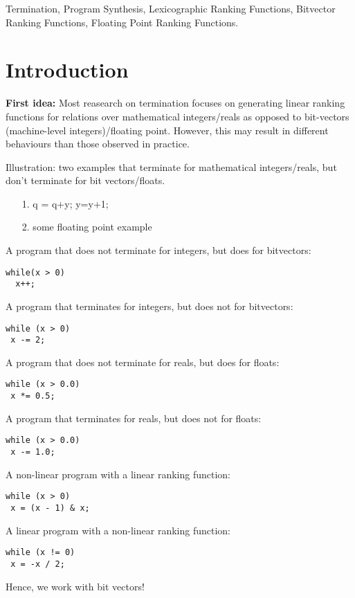 \documentclass[preprint]{sigplanconf}
\theoremstyle{definition}
\begin{document}
\keywords
Termination, Program Synthesis, Lexicographic Ranking Functions, Bitvector Ranking Functions,
Floating Point Ranking Functions.

\section{Introduction}
{\bf First idea:}
Most reasearch on termination focuses on generating linear ranking functions for relations over mathematical integers/reals as opposed to 
bit-vectors (machine-level integers)/floating point. However, this may result in different behaviours than those observed in practice.

Illustration: two examples that terminate for mathematical integers/reals, but don't terminate for bit vectors/floats.
\begin{itemize}
\item[1.] q = q+y; y=y+1;
\item[2.] some floating point example
\end{itemize}

A program that does not terminate for integers, but does for bitvectors:
\begin{lstlisting}
while(x > 0)
  x++;
\end{lstlisting}

A program that terminates for integers, but does not for bitvectors:
\begin{lstlisting}
while (x > 0)
 x -= 2;
\end{lstlisting}

A program that does not terminate for reals, but does for floats:
\begin{lstlisting}
while (x > 0.0)
 x *= 0.5;
\end{lstlisting}

A program that terminates for reals, but does not for floats:
\begin{lstlisting}
while (x > 0.0)
 x -= 1.0;
\end{lstlisting}

A non-linear program with a linear ranking function:
\begin{lstlisting}
while (x > 0)
 x = (x - 1) & x;
\end{lstlisting}

A linear program with a non-linear ranking function:
\begin{lstlisting}
while (x != 0)
 x = -x / 2;
\end{lstlisting}


Hence, we work with bit vectors!
\end{document}
